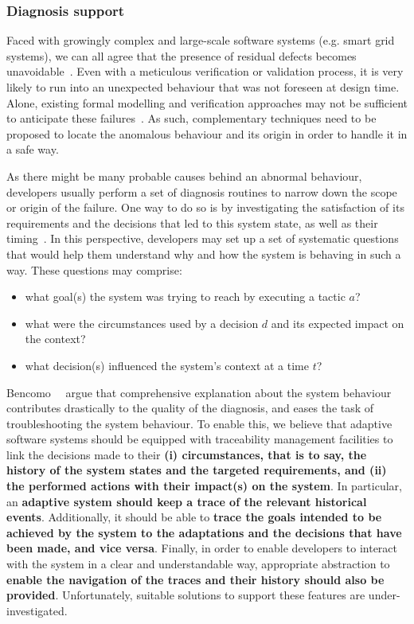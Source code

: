 \subsubsection{Diagnosis support}

Faced with growingly complex and large-scale software systems (e.g. smart grid systems), we can all agree that the presence of residual defects becomes unavoidable~\cite{DBLP:conf/icse/BarbosaLMJ17, DBLP:conf/icse/MongielloPS15, DBLP:conf/icse/HassanBB15}. 
Even with a meticulous verification or validation process, it is very likely to run into an unexpected behaviour that was not foreseen at design time. Alone, existing formal modelling and verification approaches may not be sufficient to anticipate these failures~\cite{DBLP:conf/icse/TaharaOH17}. 
As such, complementary techniques need to be proposed to locate the anomalous behaviour and its origin in order to handle it in a safe way.

As there might be many probable causes behind an abnormal behaviour, developers usually perform a set of diagnosis routines to narrow down the scope or origin of the failure. One way to do so is by investigating the satisfaction of its requirements and the decisions that led to this system state, as well as their timing~\cite{DBLP:conf/iceccs/BencomoWSW12}.  
In this perspective, developers may set up a set of systematic questions that would help them understand why and how the system is behaving in such a way.
These questions may comprise: 
\begin{itemize}
   \item what goal(s) the system was trying to reach by executing a tactic $a$? 
   \item what were the circumstances used by a decision $d$ and its expected impact on the context?
   \item what decision(s) influenced the system's context at a time $t$? 
\end{itemize}

Bencomo~\etal~\cite{DBLP:conf/iceccs/BencomoWSW12} argue that comprehensive explanation about the system behaviour contributes drastically to the quality of the diagnosis, and eases the task of troubleshooting the system behaviour.
To enable this, we believe that adaptive software systems should be equipped with traceability management facilities to link the decisions made to their \textbf{(i) circumstances, that is to say, the history of the system states and the targeted requirements, and (ii) the performed actions with their impact(s) on the system}.
In particular, an \textbf{adaptive system should keep a trace of the relevant historical events}.
Additionally, it should be able to \textbf{trace the goals intended to be achieved by the system to the adaptations and the decisions that have been made, and vice versa}. 
Finally, in order to enable developers to interact with the system in a clear and understandable way, appropriate abstraction to \textbf{enable the navigation of the traces and their history should also be provided}.
Unfortunately, suitable solutions to support these features are under-investigated. 

